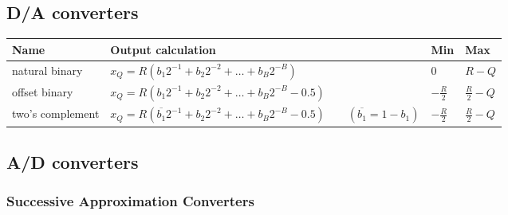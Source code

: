 \subsection{D/A converters}
\begin{tabularx}{\textwidth}{|l|X|l|l|}
	\hline
	\textbf{Name} & \textbf{Output calculation} & \textbf{Min} & \textbf{Max}
	\\ \hline
	natural binary
	& $x_Q = R(b_1 2^{-1} + b_2 2^{-2} + \ldots + b_B 2^{-B})$ 
	& $0$
	& $R-Q$
	\\ \hline
	offset binary
	& $x_Q = R(b_1 2^{-1} + b_2 2^{-2} + \ldots + b_B 2^{-B} - 0.5)$ 
	& $-\frac{R}{2}$ 
	& $\frac{R}{2} - Q$ 
	\\ \hline
	two's complement
	& $x_Q = R(\overline{b_1} 2^{-1} + b_2 2^{-2} + \ldots + b_B 2^{-B} - 0.5) \qquad (\overline{b_1}=1-b_1)$
	& $-\frac{R}{2}$ 
	& $\frac{R}{2} - Q$ 
	\\ \hline
\end{tabularx}


\subsection{A/D converters}

\subsubsection{Successive Approximation Converters }

